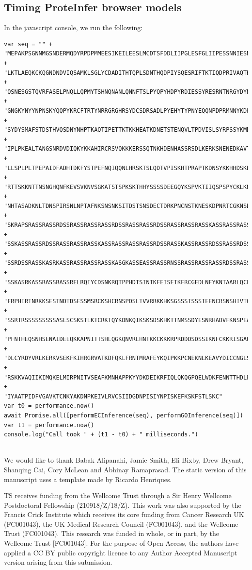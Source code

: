 \subsection*{Timing ProteInfer browser models}
In the javascript console, we run the following:
\begin{tiny}
\begin{verbatim}
var seq = "" +
"MEPAKPSGNNMGSNDERMQDYRPDPMMEESIKEILEESLMCDTSFDDLIIPGLESFGLIIPESSNNIESNNVEEGSDGE" +
"LKTLAEQKCKQGNDNDVIQSAMKLSGLYCDADITHTQPLSDNTHQDPIYSQESRIFTKTIQDPRIVAQTHRQCTSSASNL" + 
"QSNESGSTQVRFASELPNQLLQPMYTSHNQNANLQNNFTSLPYQPYHDPYRDIESSYRESRNTNRGYDYNFRHHPYRPRG" + 
"GNGKYNYYNPNSKYQQPYKRCFTRTYNRRGRGHRSYDCSDRSADLPYEHYTYPNYEQQNPDPRMNNYKDFTQLTNKFNFE" + 
"SYDYSMAFSTDSTHVQSDNYNHPTKAQTIPETTKTKKHEATKDNETSTENQVLTPDVISLSYRPSSYKMDIIKKIYDTDV" + 
"IPLPKEALTANGSNRDVDIQKYKKAHIRCRSVQKKKERSSQTNKHDENHASSRSDLKERKSNENEDKAVTKARDFSKLNP" + 
"LLSPLPLTPEPAIDFADHTDKFYSTPEFNQIQQNLHRSKTSLQDTVPISKHTPRAPTKDNSYKKHHDSKDNYPKMKHSPG" + 
"RTTSKKNTTNSNGHQNFKEVSVKNVSGKATSTSPKSKTHHYSSSSDEEGQYKSPVKTIIQSPSPYCKLKNPSIMDKNSAK" + 
"NHTASADKNLTDNSPIRSNLNPTAFNKSNSNKSITDSTSNSDECTDRKPNCNSTKNESKDPNRTCGKNSDKHLSKSCTMA" + 
"SKRAPSRASSRASSRDSSRASSRASSRASSRDSSRASSRASSRDSSRASSRASSRASSKASSRASSRASSRASSRDSSRA" + 
"SSKASSRASSRDSSRASSRASSRASSKASSRASSRASSRASSRDSSRASSKASSRASSRDSSRASSRDSSRDSSRASSRA" + 
"SSRDSSRASSKASRKASSRASSRASSRASSKASGKASSEASSRASSRNSSRASSRASSRASSRDSSRASSRASSRDSSRA" + 
"SSKASRKASSRASSRASSRELRQIYCDSNKRQTPPHDTSINTKFEISEIKFRCGEDLNFYKNTAARLQCFNHNDQFYNPR" + 
"FRPHIRTNRKKSESTNDTDSESSMSRCKSHCRNSPDSLTVVRRKKHKSGSSSISSSIEENCRSNSHIVTGKEKFTPFYYQ" + 
"SSRTRSSSSSSSSSASLSCSKSTLKTCRKTQYKDNKQIKSKSDSKHKTTNMSSDYESNRHADVFKNSPEAGEKFPLHNSS" + 
"PFNTHEQSNHSENAIDEEQKKAPNITTSHLQGKQNVRLHNTKKCKKKRPRDDDSDSSIKNFCKKRISGAQKTESEVSEPD" + 
"DLCYRDYVRLKERKVSEKFKIHRGRVATKDFQKLFRNTMRAFEYKQIPKKPCNEKNLKEAVYDICCNGLSNNAAIIMYFT" + 
"RSKKVAQIIKIMQKELMIRPNITVSEAFKMNHAPPKYYDKDEIKRFIQLQKQGPQELWDKFENNTTHDLFTRHSDVKTMI" + 
"IYAATPIDFVGAVKTCNKYAKDNPKEIVLRVCSIIDGDNPISIYNPISKEFKSKFSTLSKC"
var t0 = performance.now()
await Promise.all([performECInference(seq), performGOInference(seq)])
var t1 = performance.now()
console.log("Call took " + (t1 - t0) + " milliseconds.")
    
\end{verbatim}
\end{tiny}

\begin{acknowledgements}
  We would like to thank Babak Alipanahi, Jamie Smith, Eli Bixby, Drew Bryant, Shanqing Cai, Cory McLean and Abhinay Ramaprasad. The static version of this manuscript uses a template made by Ricardo Henriques.

  TS receives funding from the Wellcome Trust through a Sir Henry Wellcome Postdoctoral Fellowship (210918/Z/18/Z). This work was also supported by the Francis Crick Institute which receives its core funding from Cancer Research UK (FC001043), the UK Medical Research Council (FC001043), and the Wellcome Trust (FC001043). This research was funded in whole, or in part, by the Wellcome Trust [FC001043]. For the purpose of Open Access, the authors have applied a CC BY public copyright licence to any Author Accepted Manuscript version arising from this submission.

\end{acknowledgements}

